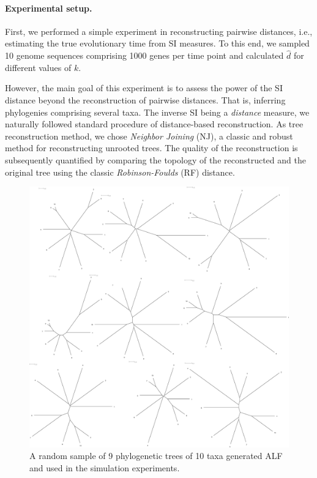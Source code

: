 \documentclass[9pt,english,utf8]{article}
\begin{document}
\paragraph{Experimental setup.}
First, we performed a simple experiment in reconstructing pairwise distances,
i.e., estimating the true evolutionary time from SI measures. To this end, we
sampled 10 genome sequences comprising 1000 genes per time point and calculated
$\hat d$ for different values of $k$.  

However, the main goal of this experiment is to assess the power of the SI
distance beyond the reconstruction of pairwise distances. That is, inferring
phylogenies comprising several taxa. The inverse SI being a \emph{distance}
measure, we naturally followed standard procedure of distance-based
reconstruction. As tree reconstruction method, we chose \emph{Neighbor
Joining} (NJ), a classic and robust method for reconstructing unrooted trees.
The quality of the reconstruction is subsequently quantified by comparing the
topology of the reconstructed and the original tree using the classic
\emph{Robinson-Foulds} (RF) distance.  

\begin{figure}[h]
    \centering \includegraphics[width=\columnwidth]{true_trees_s10_pam10}

    \caption{A random sample of 9 phylogenetic trees of 10 taxa generated ALF
    and used in the simulation experiments.}
    \label{fig:tree}
\end{figure}
\end{document}
